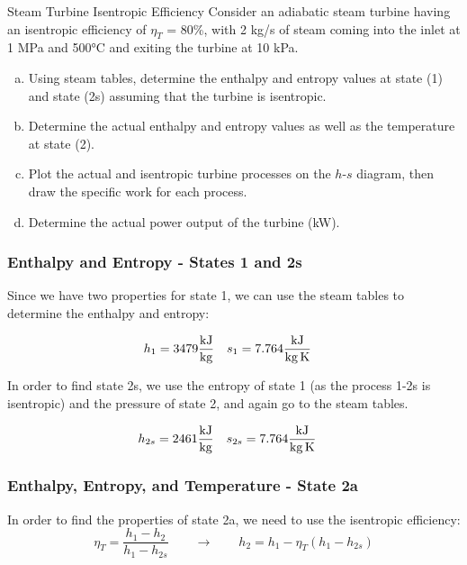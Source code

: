 \begin{example}[label=ex:isentropicEffTurbine]{Steam Turbine Isentropic Efficiency}
  Consider an adiabatic steam turbine having an isentropic efficiency of $\eta_T$ = 80\%, with 2 kg/s of steam coming into the inlet at 1 MPa and 500°C and exiting the turbine at 10 kPa.

  \begin{enumerate}[a)]
  \item Using steam tables, determine the enthalpy and entropy values at state (1) and state (2s) assuming that the turbine is isentropic.
  \item Determine the actual enthalpy and entropy values as well as the temperature at state (2). 
  \item Plot the actual and isentropic turbine processes on the $h$-$s$ diagram, then draw the specific work for each process.
  \item Determine the actual power output of the turbine (kW). 
  \end{enumerate}

  \subsubsection*{Enthalpy and Entropy - States 1 and 2s}
  Since we have two properties for state 1, we can use the steam tables to determine the enthalpy and entropy:

  \begin{align*}
    h_1 &= 3479 \frac{\rm kJ}{\rm kg} & s_1 &= 7.764 \frac{\rm kJ}{\rm kg\,K}
  \end{align*}

  In order to find state 2s, we use the entropy of state 1 (as the process 1-2s is isentropic) and the pressure of state 2, and again go to the steam tables.

  \begin{align*}
    h_{2s} &= 2461 \frac{\rm kJ}{\rm kg} & s_{2s} &= 7.764 \frac{\rm kJ}{\rm kg\,K}
  \end{align*}

  \subsubsection*{Enthalpy, Entropy, and Temperature - State 2a}

  In order to find the properties of state 2a, we need to use the isentropic efficiency:
  \begin{equation*}
    \eta_T = \frac{h_1 - h_2}{h_1 - h_{2s}} \qquad \rightarrow \qquad h_2 = h_1 - \eta_T \left( h_1 - h_{2s} \right)
  \end{equation*}


\end{example}
